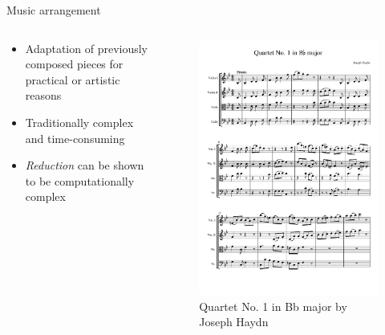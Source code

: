\documentclass[handout]{beamer}
\begin{document}
\begin{frame}{Music arrangement}
    \begin{columns}
        \begin{column}{0.6\textwidth}
            \begin{itemize}[<+(1)->]
                \item Adaptation of previously composed pieces for practical or artistic reasons
                \item Traditionally complex and time-consuming
                \item \emph{Reduction} can be shown to be computationally complex\footnotemark
            \end{itemize}
        \end{column}
        \begin{column}{0.4\textwidth}
            \begin{figure}
                \includegraphics[width=\textwidth, page=1]{haydn.pdf}
                \caption{Quartet No. 1 in Bb major by Joseph Haydn}
            \end{figure}
        \end{column}
    \end{columns}


\end{frame}
\end{document}
